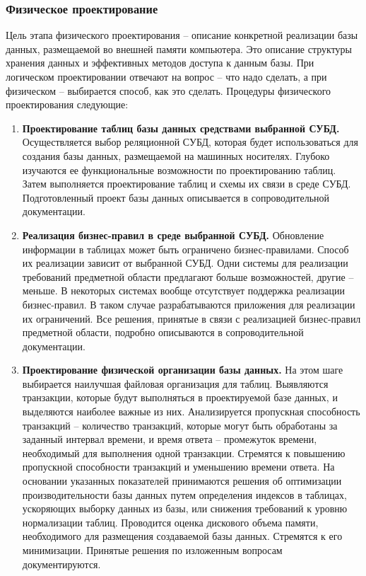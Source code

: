 \subsubsection{Физическое проектирование}

Цель этапа физического проектирования – описание конкретной реализации базы данных, размещаемой во внешней
памяти компьютера. Это описание структуры хранения данных и эффективных методов доступа к данным базы. При
логическом проектировании отвечают на вопрос – что надо сделать, а при физическом – выбирается способ, как
это сделать. Процедуры физического проектирования следующие:
\begin{enumerate}
    \item \textbf{Проектирование таблиц базы данных средствами выбранной СУБД.}
        Осуществляется выбор реляционной СУБД, которая будет использоваться для создания базы данных,
        размещаемой на машинных носителях. Глубоко изучаются ее функциональные возможности по проектированию
        таблиц. Затем выполняется проектирование таблиц и схемы их связи в среде СУБД. Подготовленный проект
        базы данных описывается в сопроводительной документации.

    \item \textbf{Реализация бизнес-правил в среде выбранной СУБД.}
        Обновление информации в таблицах может быть ограничено бизнес-правилами. Способ их реализации
        зависит от выбранной СУБД. Одни системы для реализации требований предметной области предлагают
        больше возможностей, другие – меньше. В некоторых системах вообще отсутствует поддержка реализации
        бизнес-правил. В таком случае разрабатываются приложения для реализации их ограничений. Все решения,
        принятые в связи с реализацией бизнес-правил предметной области, подробно описываются в сопроводительной
        документации.

    \item \textbf{Проектирование физической организации базы данных.}
        На этом шаге выбирается наилучшая файловая организация для таблиц. Выявляются транзакции, которые
        будут выполняться в проектируемой базе данных, и выделяются наиболее важные из них. Анализируется
        пропускная способность транзакций – количество транзакций, которые могут быть обработаны за заданный
        интервал времени, и время ответа – промежуток времени, необходимый для выполнения одной транзакции.
        Стремятся к повышению пропускной способности транзакций и уменьшению времени ответа. На основании указанных
        показателей принимаются решения об оптимизации производительности базы данных путем определения индексов
        в таблицах, ускоряющих выборку данных из базы, или снижения требований к уровню нормализации таблиц.
        Проводится оценка дискового объема памяти, необходимого для размещения создаваемой базы данных.
        Стремятся к его минимизации. Принятые решения по изложенным вопросам документируются.


\end{enumerate}
